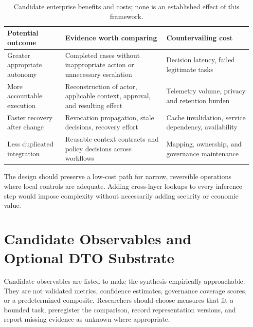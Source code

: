 \documentclass[11pt,letterpaper]{article}
\begin{document}
\begin{table}[htbp]
\centering\small
\begin{tabular}{P{0.28\textwidth} P{0.32\textwidth} P{0.28\textwidth}}
\toprule
Potential outcome & Evidence worth comparing & Countervailing cost \\
\midrule
Greater appropriate autonomy & Completed cases without inappropriate action or unnecessary escalation & Decision latency, failed legitimate tasks \\
More accountable execution & Reconstruction of actor, applicable context, approval, and resulting effect & Telemetry volume, privacy and retention burden \\
Faster recovery after change & Revocation propagation, stale decisions, recovery effort & Cache invalidation, service dependency, availability \\
Less duplicated integration & Reusable context contracts and policy decisions across workflows & Mapping, ownership, and governance maintenance \\
\bottomrule
\end{tabular}
\caption{Candidate enterprise benefits and costs; none is an established effect of this framework.}
\end{table}

The design should preserve a low-cost path for narrow, reversible operations where local controls are adequate. Adding cross-layer lookups to every inference step would impose complexity without necessarily adding security or economic value.

\section{Candidate Observables and Optional DTO Substrate}
Candidate observables are listed to make the synthesis empirically approachable. They are not validated metrics, confidence estimates, governance coverage scores, or a predetermined composite. Researchers should choose measures that fit a bounded task, preregister the comparison, record representation versions, and report missing evidence as unknown where appropriate.
\end{document}
